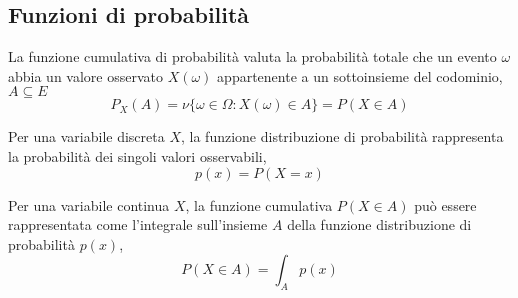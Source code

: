 \subsection{Funzioni di probabilità}
\begin{definition} La funzione cumulativa di probabilità valuta la probabilità totale che un evento $\omega$ abbia un valore osservato $X(\omega)$ appartenente a un sottoinsieme del codominio, $A \subseteq E$
\begin{equation}
    P_X(A) = \nu \{\omega \in \Omega: X(\omega) \in A \} = P(X \in A)
\end{equation}
\end{definition}
\begin{definition} Per una variabile discreta $X$, la funzione distribuzione di probabilità rappresenta la probabilità dei singoli valori osservabili,
    \begin{equation}
        p(x) = P(X = x)
    \end{equation}
\end{definition}
\begin{definition} Per una variabile continua $X$, la funzione cumulativa $P(X \in A)$ può essere rappresentata come l'integrale sull'insieme $A$ della funzione distribuzione di probabilità $p(x)$,
    \begin{equation}
       P(X\in A) = \int_{A} p(x)
    \end{equation}
\end{definition}

